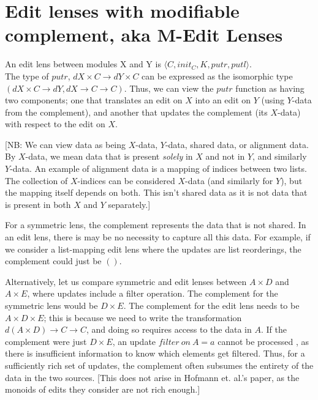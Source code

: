 \documentclass[a4paper,10pt]{article}
\title{}
\author{}
\begin{document}
\maketitle

\section{Edit lenses with modifiable complement, aka M-Edit Lenses}
An edit lens between modules X and Y is $\langle C, init_C, K, putr, putl \rangle$. \\
The type of $putr$, $dX \times C \to dY \times C$ can be expressed as the isomorphic type $(dX \times C \to dY, dX \to C \to C)$. Thus, we can view the $putr$ function as having two components; one that translates an edit on $X$ into an edit on $Y$ (using $Y$-data from the complement), and another that updates the complement (its $X$-data) with respect to the edit on $X$.

[NB: We can view data as being $X$-data, $Y$-data, shared data, or alignment data. By $X$-data, we mean data that is present \emph{solely} in $X$ and not in $Y$, and similarly $Y$-data. An example of alignment data is a mapping of indices between two lists. The collection of $X$-indices can be considered $X$-data (and similarly for $Y$), but the mapping itself depends on both. This isn't shared data as it is not data that is present in both $X$ and $Y$ separately.]

For a symmetric lens, the complement represents the data that is not shared. In an edit lens, there is may be no necessity to capture all this data. For example, if we consider a list-mapping edit lens where the updates are list reorderings, the complement could just be $()$. 

Alternatively, let us compare symmetric and edit lenses between $A \times D$ and $A \times E$, where updates include a filter operation. The complement for the symmetric lens would be $D \times E$. 
The complement for the edit lens needs to be $A \times D \times E$; this is because we need to write the transformation $d(A \times D) \to C \to C$, and doing so requires access to the data in $A$. If the complement were just $D \times E$, an update $filter~on~A=a$ cannot be processed , as there is insufficient information to know which elements get filtered.
Thus, for a sufficiently rich set of updates, the complement often subsumes the entirety of the data in the two sources.
[This does not arise in Hofmann et. al.'s paper, as the monoids of edits they consider are not rich enough.]
\end{document}

